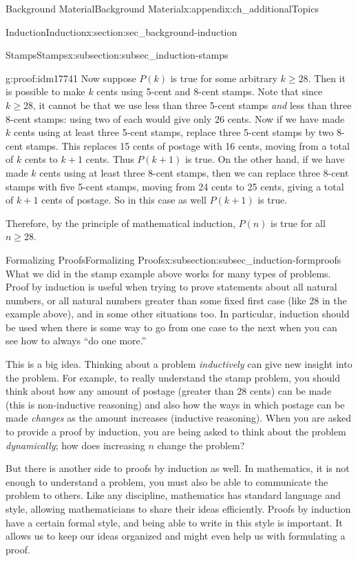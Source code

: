 \documentclass[oneside,10pt,]{book}
\numberwithin{equation}{chapter}
\begin{document}
\begin{appendixptx}{Background Material}{}{Background Material}{}{}{x:appendix:ch_additionalTopics}
\begin{sectionptx}{Induction}{}{Induction}{}{}{x:section:sec_background-induction}
\begin{subsectionptx}{Stamps}{}{Stamps}{}{}{x:subsection:subsec_induction-stamps}
\begin{proofptx}{}{g:proof:idm17741}
Now suppose \(P(k)\) is true for some arbitrary \(k \ge 28\). Then it is possible to make \(k\) cents using 5-cent and 8-cent stamps. Note that since \(k \ge 28\), it cannot be that we use less than three 5-cent stamps \emph{and} less than three 8-cent stamps: using two of each would give only 26 cents. Now if we have made \(k\) cents using at least three 5-cent stamps, replace three 5-cent stamps by two 8-cent stamps. This replaces 15 cents of postage with 16 cents, moving from a total of \(k\) cents to \(k+1\) cents. Thus \(P(k+1)\) is true. On the other hand, if we have made \(k\) cents using at least three 8-cent stamps, then we can replace three 8-cent stamps with five 5-cent stamps, moving from 24 cents to 25 cents, giving a total of \(k+1\) cents of postage. So in this case as well \(P(k+1)\) is true.%
\par
Therefore, by the principle of mathematical induction, \(P(n)\) is true for all \(n \ge 28\).%
\end{proofptx}
\end{subsectionptx}
%
%
\typeout{************************************************}
\typeout{************************************************}
%
\begin{subsectionptx}{Formalizing Proofs}{}{Formalizing Proofs}{}{}{x:subsection:subsec_induction-formproofs}
What we did in the stamp example above works for many types of problems. Proof by induction is useful when trying to prove statements about all natural numbers, or all natural numbers greater than some fixed first case (like 28 in the example above), and in some other situations too. In particular, induction should be used when there is some way to go from one case to the next \textendash{} when you can see how to always ``do one more.''%
\par
This is a big idea. Thinking about a problem \emph{inductively} can give new insight into the problem. For example, to really understand the stamp problem, you should think about how any amount of postage (greater than 28 cents) can be made (this is non-inductive reasoning) and also how the ways in which postage can be made \emph{changes} as the amount increases (inductive reasoning). When you are asked to provide a proof by induction, you are being asked to think about the problem \emph{dynamically}; how does increasing \(n\) change the problem?%
\par
But there is another side to proofs by induction as well. In mathematics, it is not enough to understand a problem, you must also be able to communicate the problem to others. Like any discipline, mathematics has standard language and style, allowing mathematicians to share their ideas efficiently. Proofs by induction have a certain formal style, and being able to write in this style is important. It allows us to keep our ideas organized and might even help us with formulating a proof.%

\end{subsectionptx}
\end{sectionptx}
\end{appendixptx}
\end{document}
